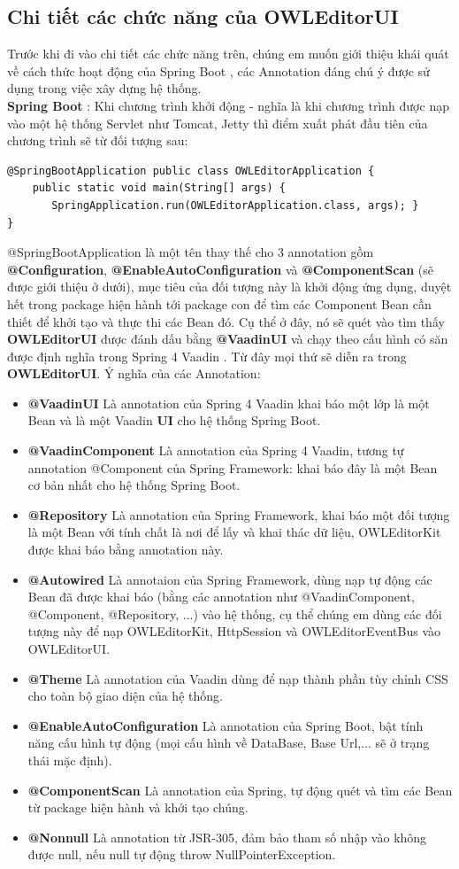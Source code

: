 \subsection{Chi tiết các chức năng của OWLEditorUI}
Trước khi đi vào chi tiết các chức năng trên, chúng em muốn giới thiệu khái quát về cách thức hoạt động của Spring Boot \cite{springboot}, các Annotation đáng chú ý được sử dụng trong việc xây dựng hệ thống.
\\
\textbf{Spring Boot} : Khi chương trình khởi động - nghĩa là khi chương trình được nạp vào một hệ thống Servlet như Tomcat, Jetty thì điểm xuất phát đầu tiên của chương trình sẽ từ đối tượng sau:
\begin{verbatim}
@SpringBootApplication public class OWLEditorApplication {
    public static void main(String[] args) {
       SpringApplication.run(OWLEditorApplication.class, args); }
}
\end{verbatim} 
@SpringBootApplication là một tên thay thế cho 3 annotation gồm \textbf{@Configuration}, \textbf{@EnableAutoConfiguration} và \textbf{@ComponentScan} (sẽ được giới thiệu ở dưới), mục tiêu của đối tượng này là khởi động ứng dụng, duyệt hết trong package hiện hành tới package con để tìm các Component Bean cần thiết để khởi tạo và thực thi các Bean đó. Cụ thể ở đây, nó sẽ quét vào tìm thấy \textbf{OWLEditorUI} được đánh dấu bằng \textbf{@VaadinUI} và chạy theo cấu hình có săn được định nghĩa trong Spring 4 Vaadin \cite{spring4vaadin}. Từ đây mọi thứ sẽ diễn ra trong \textbf{OWLEditorUI}. Ý nghĩa của các Annotation:
\begin{itemize}	
\item \textbf{@VaadinUI} Là annotation của Spring 4 Vaadin \cite{spring4vaadin} khai báo một lớp là một Bean và là một Vaadin \textbf{UI} cho hệ thống Spring Boot.
\item \textbf{@VaadinComponent} Là annotation của Spring 4 Vaadin, tương tự annotation @Component của Spring Framework: khai báo đây là một Bean cơ bản nhất cho hệ thống Spring Boot.
\item \textbf{@Repository} Là annotation của Spring Framework, khai báo một đối tượng là một Bean với tính chất là nơi để lấy và khai thác dữ liệu, OWLEditorKit được khai báo bằng annotation này.
\item \textbf{@Autowired} Là annotaion của Spring Framework, dùng nạp tự động các Bean đã được khai báo (bằng các annotation như @VaadinComponent, @Component, @Repository, ...) vào hệ thống, cụ thể chúng em dùng các đối tượng này để nạp OWLEditorKit, HttpSession và OWLEditorEventBus vào OWLEditorUI.
\item \textbf{@Theme} Là annotation của Vaadin dùng để nạp thành phần tùy chỉnh CSS cho toàn bộ giao diện của hệ thống.
\item \textbf{@EnableAutoConfiguration} Là annotation của Spring Boot, bật tính năng cấu hình tự động (mọi cấu hình về DataBase, Base Url,... sẽ ở trạng thái mặc định).
\item \textbf{@ComponentScan} Là annotation của Spring, tự động quét và tìm các Bean từ package hiện hành và khởi tạo chúng.
\item \textbf{@Nonnull} Là annotation từ JSR-305, đảm bảo tham số nhập vào không được null, nếu null tự động throw NullPointerException.
\end{itemize}
